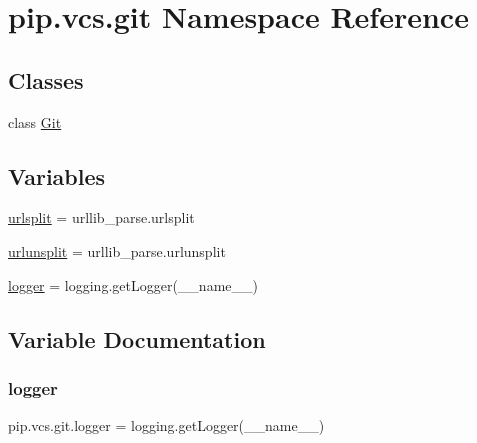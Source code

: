 \hypertarget{namespacepip_1_1vcs_1_1git}{}\section{pip.\+vcs.\+git Namespace Reference}
\label{namespacepip_1_1vcs_1_1git}
\subsection*{Classes}
\begin{DoxyCompactItemize}
\item 
class \hyperlink{classpip_1_1vcs_1_1git_1_1_git}{Git}
\end{DoxyCompactItemize}
\subsection*{Variables}
\begin{DoxyCompactItemize}
\item 
\hyperlink{namespacepip_1_1vcs_1_1git_a09a2c1351210ec9865ac16885f5a5b50}{urlsplit} = urllib\+\_\+parse.\+urlsplit
\item 
\hyperlink{namespacepip_1_1vcs_1_1git_a890c46e2e96bebe9df6c1394d88a3b4a}{urlunsplit} = urllib\+\_\+parse.\+urlunsplit
\item 
\hyperlink{namespacepip_1_1vcs_1_1git_af1c467e2d37a9c757bfb21b7a8636072}{logger} = logging.\+get\+Logger(\+\_\+\+\_\+name\+\_\+\+\_\+)
\end{DoxyCompactItemize}


\subsection{Variable Documentation}
\mbox{\label{namespacepip_1_1vcs_1_1git_af1c467e2d37a9c757bfb21b7a8636072}} 
\subsubsection{\texorpdfstring{logger}{logger}}
{\footnotesize\ttfamily pip.\+vcs.\+git.\+logger = logging.\+get\+Logger(\+\_\+\+\_\+name\+\_\+\+\_\+)}

\mbox{\label{namespacepip_1_1vcs_1_1git_a09a2c1351210ec9865ac16885f5a5b50}} 
